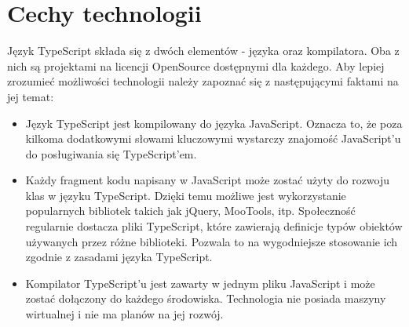 \section{Cechy technologii}
Język TypeScript składa się z dwóch elementów - języka oraz kompilatora. Oba z nich są projektami na licencji OpenSource dostępnymi dla każdego. Aby lepiej zrozumieć możliwości technologii należy zapoznać się z następującymi faktami na jej temat:
\begin{itemize}
\item Język TypeScript jest kompilowany do języka JavaScript. Oznacza to, że poza kilkoma dodatkowymi słowami kluczowymi wystarczy znajomość JavaScript'u do posługiwania się TypeScript'em. 
\item Każdy fragment kodu napisany w JavaScript może zostać użyty do rozwoju klas w języku TypeScript. Dzięki temu możliwe jest wykorzystanie popularnych bibliotek takich jak jQuery, MooTools, itp. Społeczność regularnie dostacza pliki TypeScript, które zawierają definicje typów obiektów używanych przez różne biblioteki. Pozwala  to na wygodniejsze stosowanie ich zgodnie z zasadami języka TypeScript. 
\item Kompilator TypeScript'u jest zawarty w jednym pliku JavaScript i może zostać dołączony do każdego środowiska. Technologia nie posiada maszyny wirtualnej i nie ma planów na jej rozwój.
\end{itemize}
